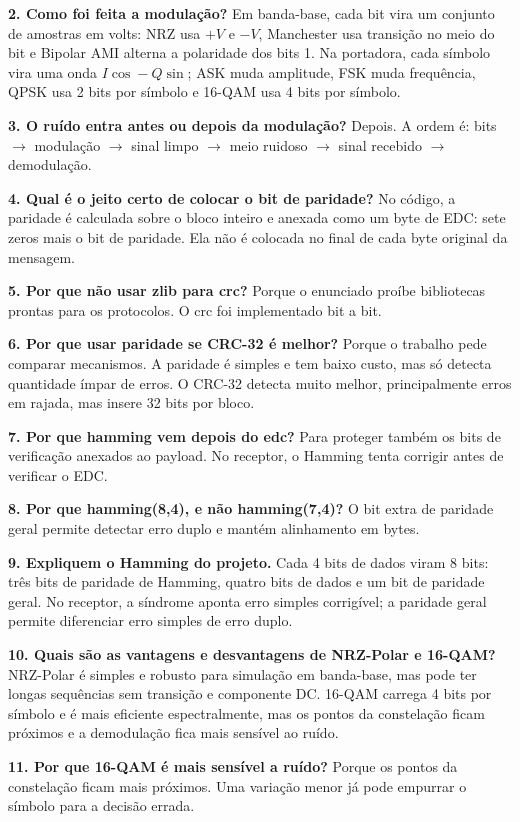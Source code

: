 \documentclass[10pt,a4paper]{article}
\begin{document}
\textbf{2. Como foi feita a modulação?} Em banda-base, cada bit vira um
conjunto de amostras em volts: NRZ usa \(+V\) e \(-V\), Manchester usa
transição no meio do bit e Bipolar AMI alterna a polaridade dos bits 1. Na
portadora, cada símbolo vira uma onda \(I\cos - Q\sin\); ASK muda
amplitude, FSK muda frequência, QPSK usa 2 bits por símbolo e 16-QAM usa 4 bits
por símbolo.

\textbf{3. O ruído entra antes ou depois da modulação?} Depois. A ordem é:
bits \(\to\) modulação \(\to\) sinal limpo \(\to\) meio ruidoso \(\to\) sinal
recebido \(\to\) demodulação.

\textbf{4. Qual é o jeito certo de colocar o bit de paridade?} No código, a
paridade é calculada sobre o bloco inteiro e anexada como um byte de EDC: sete
zeros mais o bit de paridade. Ela não é colocada no final de cada byte original
da mensagem.

\textbf{5. Por que não usar zlib para crc?} Porque o enunciado proíbe
bibliotecas prontas para os protocolos. O crc foi implementado bit a bit.

\textbf{6. Por que usar paridade se CRC-32 é melhor?} Porque o trabalho pede
comparar mecanismos. A paridade é simples e tem baixo custo, mas só detecta
quantidade ímpar de erros. O CRC-32 detecta muito melhor, principalmente erros
em rajada, mas insere 32 bits por bloco.

\textbf{7. Por que hamming vem depois do edc?} Para proteger também os bits de
verificação anexados ao payload. No receptor, o Hamming tenta corrigir antes de
verificar o EDC.

\textbf{8. Por que hamming(8,4), e não hamming(7,4)?} O bit extra de paridade
geral permite detectar erro duplo e mantém alinhamento em bytes.

\textbf{9. Expliquem o Hamming do projeto.} Cada 4 bits de dados viram 8 bits:
três bits de paridade de Hamming, quatro bits de dados e um bit de paridade
geral. No receptor, a síndrome aponta erro simples corrigível; a paridade geral
permite diferenciar erro simples de erro duplo.

\textbf{10. Quais são as vantagens e desvantagens de NRZ-Polar e 16-QAM?}
NRZ-Polar é simples e robusto para simulação em banda-base, mas pode ter longas
sequências sem transição e componente DC. 16-QAM carrega 4 bits por símbolo e é
mais eficiente espectralmente, mas os pontos da constelação ficam próximos e a
demodulação fica mais sensível ao ruído.

\textbf{11. Por que 16-QAM é mais sensível a ruído?} Porque os pontos da
constelação ficam mais próximos. Uma variação menor já pode empurrar o símbolo
para a decisão errada.
\end{document}
